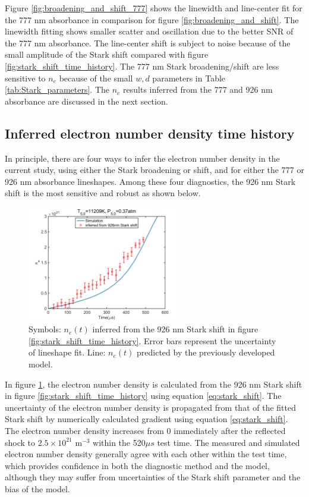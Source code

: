 \documentclass[12pt]{iopart}
\begin{document}
Figure \ref{fig:broadening_and_shift_777} shows the linewidth and line-center fit for the 777 nm absorbance  in comparison for figure \ref{fig:broadening_and_shift}. The linewidth fitting shows smaller scatter and oscillation due to the better SNR of the 777 nm absorbance. The line-center shift is subject to noise because of the small amplitude of the Stark shift compared with figure \ref{fig:stark_shift_time_history}. The 777 nm Stark broadening/shift are less sensitive to $n_e$ because of the small $w,d$ parameters in Table \ref{tab:Stark_parameters}. The $n_e$ results inferred from the 777 and 926 nm absorbance are discussed in the next section.



\subsection{Inferred electron number density time history}
In principle, there are four ways to infer the electron number density in the current study, using either the Stark broadening or shift, and for either the 777 or 926 nm absorbance lineshapes. Among these four diagnostics, the 926 nm Stark shift is the most sensitive and robust as shown below.


\begin{figure}[h]
    \centering
    \includegraphics[width=0.6\textwidth]{11209K_037atm_ne_sim_926.png}
    \caption{Symbols: $n_e(t)$ inferred from the 926 nm Stark shift in figure \ref{fig:stark_shift_time_history}.  Error bars represent the uncertainty of lineshape fit. Line: $n_e(t)$ predicted by the previously developed model. }
    \label{fig:ne_time_history}
\end{figure}
In figure \ref{fig:ne_time_history}, the electron number density is calculated from the 926 nm Stark shift in figure \ref{fig:stark_shift_time_history} using equation \ref{eq:stark_shift}. The uncertainty of the electron number density is propagated from that of the fitted Stark shift by numerically calculated gradient using equation \ref{eq:stark_shift}. The electron number density increases from 0 immediately after the reflected shock to $2.5\times10^{21}$ m$^{-3}$ within the 520$\mu s$ test time. The measured and simulated electron number density generally agree with each other within the test time, which provides confidence in both the diagnostic method and the model, although they may suffer from uncertainties of the Stark shift parameter and the bias of the model.
\end{document}
